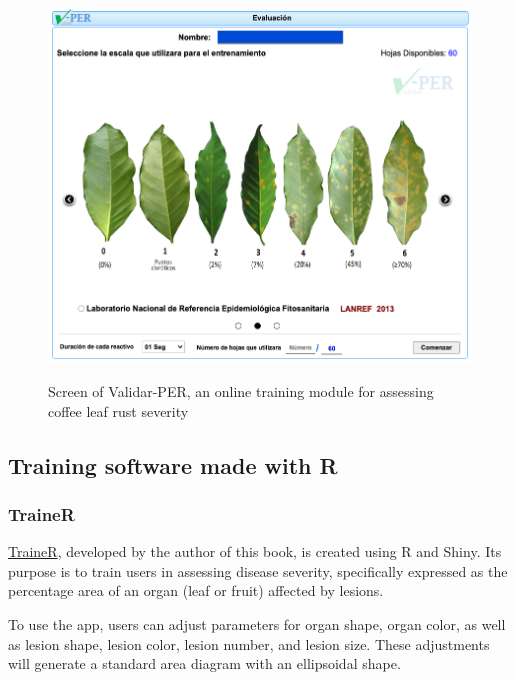 \documentclass[
  letterpaper,
]{book}
\begin{document}
\begin{figure}

\href{http://royacafe.lanref.org.mx/ValidarPer/app/index.php}{\includegraphics[width=4.47917in,height=\textheight]{imgs/validar-per.png}}

\caption{\label{fig-validar}Screen of Validar-PER, an online training
module for assessing coffee leaf rust severity}

\end{figure}

\hypertarget{training-software-made-with-r}{%
\subsection{Training software made with
R}\label{training-software-made-with-r}}

\hypertarget{trainer}{%
\subsubsection{TraineR}\label{trainer}}

\href{https://edelponte.shinyapps.io/traineR/}{TraineR}, developed by
the author of this book, is created using R and Shiny. Its purpose is to
train users in assessing disease severity, specifically expressed as the
percentage area of an organ (leaf or fruit) affected by lesions.

To use the app, users can adjust parameters for organ shape, organ
color, as well as lesion shape, lesion color, lesion number, and lesion
size. These adjustments will generate a standard area diagram with an
ellipsoidal shape.
\end{document}

